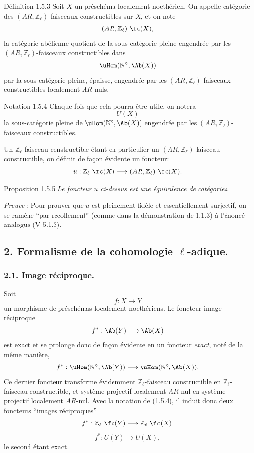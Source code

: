 \begin{statement}{Définition 1.5.3}
Soit \(X\) un préschéma localement noethérien. On appelle catégorie des \((AR,\mathbb{Z}_\ell)\)-faisceaux constructibles sur \(X\), et on note
\[
(AR,\mathbb{Z}_\ell)\text{-}\fc(X),
\]
la
catégorie abélienne quotient de la sous-catégorie pleine engendrée par les \((AR,\mathbb{Z}_\ell)\)-faisceaux constructibles dans
\[
\uHom(\mathbb{N}^\circ,\Ab(X))
\]
par la sous-catégorie pleine, épaisse, engendrée par les \((AR,\mathbb{Z}_\ell)\)-faisceaux constructibles localement \(AR\)-nuls.
\end{statement}

\begin{statement}{Notation 1.5.4}
Chaque fois que cela pourra être utile, on notera
\[
U(X)
\]
la sous-catégorie pleine de \(\uHom(\mathbb{N}^\circ,\Ab(X))\) engendrée par les \((AR,\mathbb{Z}_\ell)\)-faisceaux constructibles.
\end{statement}

Un \(\mathbb{Z}_\ell\)-faisceau constructible étant en particulier un \((AR,\mathbb{Z}_\ell)\)-faisceau constructible, on définit de façon évidente un foncteur:
\[
u:\mathbb{Z}_\ell\text{-}\fc(X)\longrightarrow (AR,\mathbb{Z}_\ell)\text{-}\fc(X).
\]

\begin{statement}{Proposition 1.5.5}
\emph{Le foncteur} \(u\) \emph{ci-dessus est une équivalence de catégories}.
\end{statement}

\emph{Preuve} : Pour prouver que \(u\) est pleinement fidèle et essentiellement surjectif, on se ramène ``par recollement'' (comme dans la démonstration de 1.1.3) à l'énoncé analogue (V 5.1.3).

\subsection*{2. Formalisme de la cohomologie \(\ell\)-adique.}

\subsubsection*{2.1. Image réciproque.}

Soit
\[
f:X\longrightarrow Y
\]
un morphisme de préschémas localement noethériens. Le foncteur image réciproque
\[
f^*:\Ab(Y)\longrightarrow \Ab(X)
\]
est exact et se prolonge donc de façon évidente en un foncteur \emph{exact}, noté de la même manière,
\[
f^*:\uHom(\mathbb{N}^\circ,\Ab(Y))\longrightarrow \uHom(\mathbb{N}^\circ,\Ab(X)).
\]
Ce dernier foncteur transforme évidemment \(\mathbb{Z}_\ell\)-faisceau constructible en \(\mathbb{Z}_\ell\)-faisceau constructible, et système projectif localement \(AR\)-nul en système projectif localement \(AR\)-nul. Avec la notation de (1.5.4), il induit donc deux foncteurs ``images réciproques''
\[
f^*:\mathbb{Z}_\ell\text{-}\fc(Y)\longrightarrow \mathbb{Z}_\ell\text{-}\fc(X),
\]
\[
f^*:U(Y)\longrightarrow U(X),
\]
le second étant exact.

